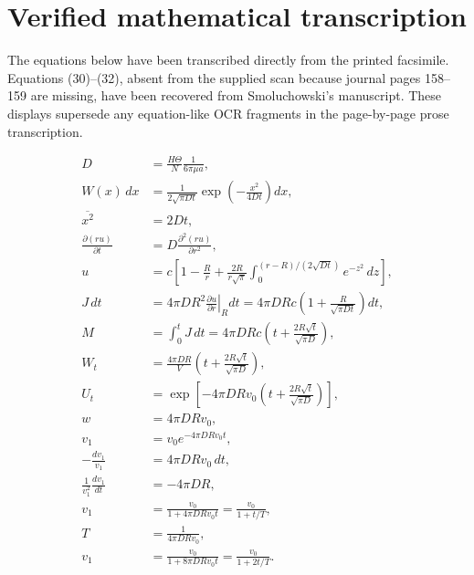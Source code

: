 \section*{Verified mathematical transcription}
\noindent The equations below have been transcribed directly from the printed facsimile. Equations (30)--(32), absent from the supplied scan because journal pages 158--159 are missing, have been recovered from Smoluchowski's manuscript. These displays supersede any equation-like OCR fragments in the page-by-page prose transcription.

\begin{align}
D&=\frac{H\Theta}{N}\frac{1}{6\pi\mu a},\tag{1}\\
W(x)\,dx&=\frac{1}{2\sqrt{\pi Dt}}\exp\!\left(-\frac{x^2}{4Dt}\right)dx,\tag{2}\\
\overline{x^2}&=2Dt,\tag{3}\\
\frac{\partial(ru)}{\partial t}&=D\frac{\partial^2(ru)}{\partial r^2},\tag{4}\\
u&=c\left[1-\frac{R}{r}+\frac{2R}{r\sqrt{\pi}}
\int_0^{(r-R)/(2\sqrt{Dt})}e^{-z^2}\,dz\right],\tag{5}\\
J\,dt&=4\pi DR^2\left.\frac{\partial u}{\partial r}\right|_{R}dt
=4\pi DRc\left(1+\frac{R}{\sqrt{\pi Dt}}\right)dt,\tag{6}\\
M&=\int_0^tJ\,dt=4\pi DRc\left(t+\frac{2R\sqrt t}{\sqrt{\pi D}}\right),\tag{7}\\
W_t&=\frac{4\pi DR}{V}\left(t+\frac{2R\sqrt t}{\sqrt{\pi D}}\right),\tag{8}\\
U_t&=\exp\!\left[-4\pi DRv_0\left(t+\frac{2R\sqrt t}{\sqrt{\pi D}}\right)\right],\tag{9}\\
w&=4\pi DRv_0,\tag{10}\\
v_1&=v_0e^{-4\pi DRv_0t},\tag{11}\\
-\frac{dv_1}{v_1}&=4\pi DRv_0\,dt,\tag{12}\\
\frac{1}{v_1^2}\frac{dv_1}{dt}&=-4\pi DR,\tag{13}\\
v_1&=\frac{v_0}{1+4\pi DRv_0t}=\frac{v_0}{1+t/T},\tag{14}\\
T&=\frac{1}{4\pi DRv_0},\tag{15}\\
v_1&=\frac{v_0}{1+8\pi DRv_0t}=\frac{v_0}{1+2t/T}.\tag{16}
\end{align}

